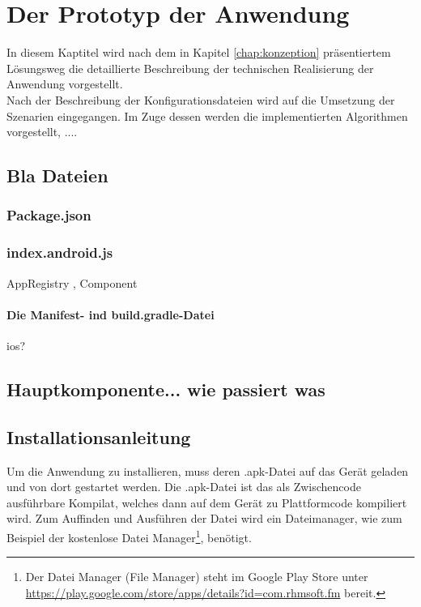 \chapter{\label{chap:implementierung}Der Prototyp der Anwendung}
In diesem Kaptitel wird nach dem in Kapitel \ref{chap:konzeption} präsentiertem Lösungsweg die detaillierte Beschreibung der technischen Realisierung der Anwendung vorgestellt.\\
Nach der Beschreibung der Konfigurationsdateien wird auf die Umsetzung der Szenarien eingegangen. Im Zuge dessen werden die implementierten Algorithmen vorgestellt, ....

\section{Bla Dateien}
\subsection{Package.json}
\subsection{index.android.js}
AppRegistry , Component

\subsubsection{Die Manifest- ind build.gradle-Datei}
ios?
\section{Hauptkomponente... wie passiert was}

%
%
\section{Installationsanleitung}
Um die Anwendung zu installieren, muss deren .apk-Datei auf das Gerät geladen und von dort gestartet werden. Die .apk-Datei ist das als Zwischencode ausführbare Kompilat, welches dann auf dem Gerät zu Plattformcode kompiliert wird. Zum Auffinden und Ausführen der Datei wird ein Dateimanager, wie zum Beispiel der kostenlose Datei Manager\footnote{ Der Datei Manager (File Manager) steht im Google Play Store unter \url{https://play.google.com/store/apps/details?id=com.rhmsoft.fm} bereit.},  benötigt.